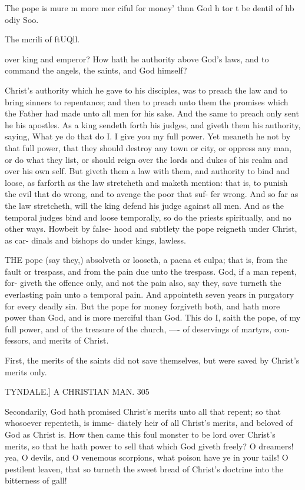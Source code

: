 \documentclass{custom}
\begin{document}
{The pope is 
mure 
m%
more mer 
ciful for 
money' thnn 
God h tor 
t be dentil of 
hb odiy 
Soo. 

The mcrili 
of ftUQll. 

over king and emperor? How hath he authority above 
God's laws, and to command the angels, the saints, and 
God himself? 

Christ's authority which he gave to his disciples, was to 
preach the law and to bring sinners to repentance; and 
then to preach unto them the promises which the Father 
had made unto all men for his sake. And the same to 
preach only sent he his apostles. As a king sendeth forth 
his judges, and giveth them his authority, saying, What ye 
do that do I. I give you my full power. Yet meaneth 
he not by that full power, that they should destroy any 
town or city, or oppress any man, or do what they list, or 
should reign over the lords and dukes of his realm and 
over his own self. But giveth them a law with them, and 
authority to bind and loose, as farforth as the law 
stretcheth and maketh mention: that is, to punish the 
evil that do wrong, and to avenge the poor that suf- 
fer wrong. And so far as the law stretcheth, will 
the king defend his judge against all men. And as the 
temporal judges bind and loose temporally, so do the 
priests spiritually, and no other ways. Howbeit by false- 
hood and subtlety the pope reigneth under Christ, as car- 
dinals and bishops do under kings, lawless. 

THE pope (say they,) absolveth or looseth, a paena et 
culpa; that is, from the fault or trespass, and from the 
pain due unto the trespass. God, if a man repent, for- 
giveth the offence only, and not the pain also, say they, 
save turneth the everlasting pain unto a temporal pain. 
And appointeth seven years in purgatory for every deadly 
sin. But the pope for money forgiveth both, and hath 
more power than God, and is more merciful than God. 
This do I, saith the pope, of my full power, and of the 
treasure of the church, —- of deservings of martyrs, con- 
fessors, and merits of Christ. 

First, the merits of the saints did not save themselves, 
but were saved by Christ's merits only. 


TYNDALE.]
A CHRISTIAN MAN.
305

Secondarily, God hath promised Christ's merits unto 
all that repent; so that whosoever repenteth, is imme- 
diately heir of all Christ's merits, and beloved of God as 
Christ is. How then came this foul monster to be lord 
over Christ's merits, so that he hath power to sell that 
which God giveth freely? O dreamers! yea, O devils, 
and O venemous scorpions, what poison have ye in your 
tails! O pestilent leaven, that so turneth the sweet bread 
of Christ's doctrine into the bitterness of gall! 

}
\end{document}
